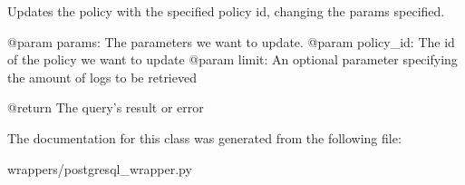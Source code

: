 \begin{DoxyVerb}Updates the policy with the specified policy id, changing the params specified.

@param params: The parameters we want to update.
@param policy_id: The id of the policy we want to update
@param limit: An optional parameter specifying the amount of logs to be retrieved

@return The query's result or error
\end{DoxyVerb}
 

The documentation for this class was generated from the following file\+:\begin{DoxyCompactItemize}
\item 
wrappers/postgresql\+\_\+wrapper.\+py\end{DoxyCompactItemize}
